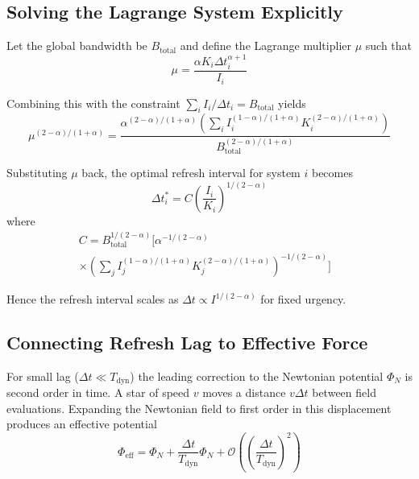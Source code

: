 \documentclass[usenatbib]{mnras}
\begin{document}
\subsection{Solving the Lagrange System Explicitly}

Let the global bandwidth be $B_{\text{total}}$ and define the Lagrange multiplier $\mu$ such that
\begin{equation}
\mu = \frac{\alpha K_i \Delta t_i^{\alpha+1}}{I_i}
\end{equation}

Combining this with the constraint $\sum_i I_i / \Delta t_i = B_{\text{total}}$ yields
\begin{equation}
\mu^{(2-\alpha)/(1+\alpha)} = \frac{\alpha^{(2-\alpha)/(1+\alpha)} \left( \sum_i I_i^{(1-\alpha)/(1+\alpha)} K_i^{(2-\alpha)/(1+\alpha)} \right)}{B_{\text{total}}^{(2-\alpha)/(1+\alpha)}}
\end{equation}

Substituting $\mu$ back, the optimal refresh interval for system $i$ becomes
\begin{equation}
\Delta t_i^* = C \left( \frac{I_i}{K_i} \right)^{1/(2-\alpha)}
\end{equation}
where 
\begin{equation}
\begin{split}
C = B_{\text{total}}^{1/(2-\alpha)} \Bigg[ \alpha^{-1/(2-\alpha)} & \\
\times \left(\sum_j I_j^{(1-\alpha)/(1+\alpha)} K_j^{(2-\alpha)/(1+\alpha)} \right)^{-1/(2-\alpha)} \Bigg]
\end{split}
\end{equation}

Hence the refresh interval scales as $\Delta t \propto I^{1/(2-\alpha)}$ for fixed urgency.

\subsection{Connecting Refresh Lag to Effective Force}

For small lag ($\Delta t \ll T_{\text{dyn}}$) the leading correction to the Newtonian potential $\Phi_N$ is second order in time. A star of speed $v$ moves a distance $v\Delta t$ between field evaluations. Expanding the Newtonian field to first order in this displacement produces an effective potential
\begin{equation}
\Phi_{\text{eff}} = \Phi_N + \frac{\Delta t}{T_{\text{dyn}}} \Phi_N + \mathcal{O}\left(\left(\frac{\Delta t}{T_{\text{dyn}}}\right)^2\right)
\end{equation}
\end{document}
